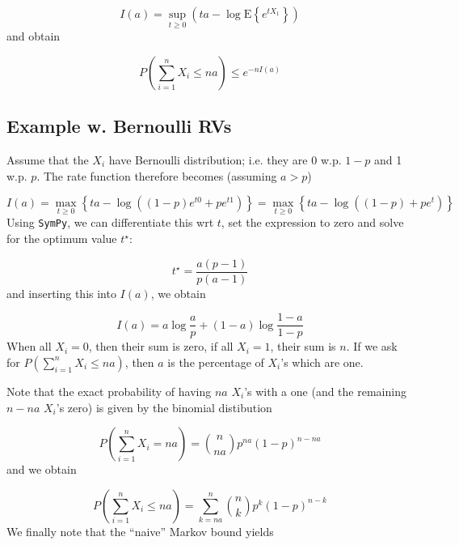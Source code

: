 \begin{equation*}
I(a) = \sup_{t \geq 0} \left( ta - \log \mathrm{E}\left\{ e^{t X_1}\right\} \right)
\end{equation*}
%
and obtain

\begin{equation}
  \label{2017-01-10:eq:ldp}
  P\left(\sum_{i=1}^n X_i \leq na \right) \leq e^{-nI(a)}
\end{equation}


\subsection{Example w. Bernoulli RVs}

Assume that the $X_i$ have Bernoulli distribution; i.e. they are 0 w.p. $1-p$ and 1 w.p. $p$. The rate function therefore becomes (assuming $a > p$)

\begin{equation*}
I(a) = \max_{t \geq 0} \left\{ ta - \log\left( (1-p)e^{t0} + pe^{t1} \right) \right\} = \max_{t \geq 0} \left\{ ta - \log\left( (1-p) + pe^{t} \right) \right\}
\end{equation*}
%
Using \verb|SymPy|, we can differentiate this wrt $t$, set the expression to zero and solve for the optimum value $t^\star$:

\begin{equation*}
t^\star = \frac{a(p-1)}{p(a-1)}
\end{equation*}
%
and inserting this into $I(a)$, we obtain

\begin{equation}
  \label{2017-01-10:eq:ratefct}
  I(a) = a \log \frac{a}{p} + (1-a) \log \frac{1-a}{1-p}
\end{equation}
%
When all $X_i=0$, then their sum is zero, if all $X_i=1$, their sum is $n$. If we ask for $P\left(\sum_{i=1}^n X_i \leq na \right)$, then $a$ is the percentage of $X_i$'s which are one.

Note that the exact probability of having $na$ $X_i$'s with a one (and the remaining $n-na$ $X_i$'s zero) is given by the binomial distibution

\begin{equation*}
P\left(\sum_{i=1}^n X_i = na \right) = {n \choose na} p^{na} (1-p)^{n-na}
\end{equation*}
%
and we obtain

\begin{equation}
\label{2017-01-10:eq:exct}
P\left(\sum_{i=1}^n X_i \leq na \right) = \sum_{k=na}^n {n \choose k} p^{k} (1-p)^{n-k}
\end{equation}
%
We finally note that the ``naive'' Markov bound yields

